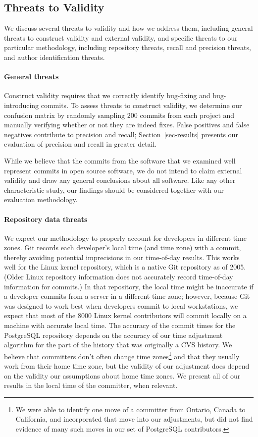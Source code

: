 \subsection{Threats to Validity}
\label{sec-validity}

We discuss several threats to validity and how we address them, including
general threats to construct validity and external validity, and specific
threats to our particular methodology, including repository threats, recall and
precision threats, and author identification threats.

\paragraph{General threats}

Construct validity requires that we correctly identify bug-fixing and
bug-introducing commits. To assess threats to construct validity, we determine
our confusion matrix by randomly sampling 200 commits from each project and
manually verifying whether or not they are indeed fixes. False positives and
false negatives contribute to precision and recall; Section~\ref{sec-results}
presents our evaluation of precision and recall in greater detail.

While we believe that the commits from the software that we examined well
represent commits in open source software, we do not intend to claim external
validity and draw any general conclusions about all software. Like any other
characteristic study, our findings should be considered together with our
evaluation methodology.

\paragraph{Repository data threats}

We expect our methodology to properly account for developers in different time
zones. Git records each developer's local time (and time zone) with a commit,
thereby avoiding potential imprecisions in our time-of-day results. This works
well for the Linux kernel repository, which is a native Git repository as of
2005. (Older Linux repository information does not accurately record time-of-day
information for commits.) In that repository, the local time might be inaccurate
if a developer commits from a server in a different time zone; however, because
Git was designed to work best when developers commit to local workstations, we
expect that most of the 8000 Linux kernel contributors will commit locally on a
machine with accurate local time. The accuracy of the commit times for the
PostgreSQL repository depends on the accuracy of our time adjustment algorithm
for the part of the history that was originally a CVS history. We believe that
committers don't often change time zones\footnote{We were able to identify one
 move of a committer from Ontario, Canada to California, and incorporated that move
 into our adjustments, but did not find evidence of many such moves in our set
 of PostgreSQL contributors.} and that they usually work from their home time
zone, but the validity of our adjustment does depend on the validity our
assumptions about home time zones. We present all of our results in the local
time of the committer, when relevant.

